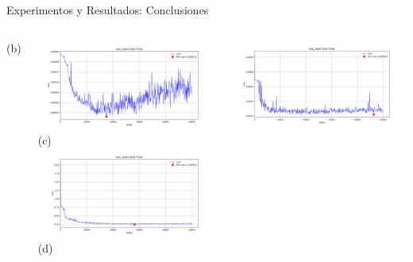 \documentclass[xcolor=dvipsnames,table]{beamer}
\begin{document}
\begin{frame}{Experimentos y Resultados: Conclusiones}
\begin{columns}[T]
\begin{minipage}[t]{\textwidth}
\begin{columns}[c]
				{\scriptsize (b)}
			\end{columns}
			
			\begin{columns}[c]
				\centering
				\includegraphics[width=\textwidth]{my_images/DL/loss_task2_plot.png}\\[-2mm]
				
				{\scriptsize (c)}
				\centering
				\includegraphics[width=\textwidth]{my_images/DL/loss_task3_plot.png}\\[-2mm]
				
				{\scriptsize (d)}
			\end{columns}
			
			\begin{columns}[c]
				\centering
				\includegraphics[width=\textwidth]{my_images/DL/loss_task4_plot.png}\\[-2mm]
				

\end{columns}
\end{minipage}
\end{columns}
\end{frame}
\end{document}
